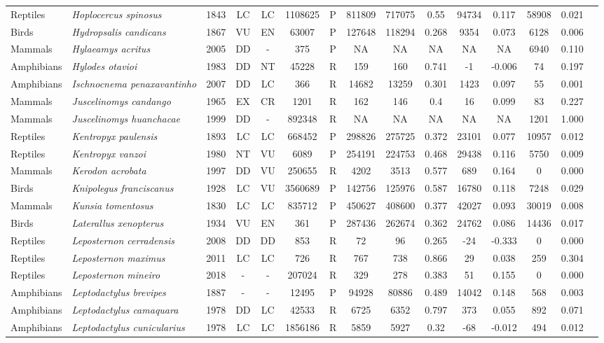 \documentclass[12pt,openright,oneside,a4paper,english]{abntex2}
\begin{document}
\begin{landscape}
\begin{longtable}{llccccccccccccc}
		Reptiles&\textit{Hoplocercus spinosus}&1843&LC&LC&1108625&P&811809&717075&0.55&94734&0.117&58908&0.021\\
		Birds&\textit{Hydropsalis candicans}&1867&VU&EN&63007&P&127648&118294&0.268&9354&0.073&6128&0.006\\
		Mammals&\textit{Hylaeamys acritus}&2005&DD&-&375&P&NA&NA&NA&NA&NA&6940&0.110\\
		Amphibians&\textit{Hylodes otavioi}&1983&DD&NT&45228&R&159&160&0.741&-1&-0.006&74&0.197\\
		Amphibians&\textit{Ischnocnema penaxavantinho}&2007&DD&LC&366&R&14682&13259&0.301&1423&0.097&55&0.001\\
		Mammals&\textit{Juscelinomys candango}&1965&EX&CR&1201&R&162&146&0.4&16&0.099&83&0.227\\
		Mammals&\textit{Juscelinomys huanchacae}&1999&DD&-&892348&R&NA&NA&NA&NA&NA&1201&1.000\\
		Reptiles&\textit{Kentropyx paulensis}&1893&LC&LC&668452&P&298826&275725&0.372&23101&0.077&10957&0.012\\
		Reptiles&\textit{Kentropyx vanzoi}&1980&NT&VU&6089&P&254191&224753&0.468&29438&0.116&5750&0.009\\
		Mammals&\textit{Kerodon acrobata}&1997&DD&VU&250655&R&4202&3513&0.577&689&0.164&0&0.000\\
		Birds&\textit{Knipolegus franciscanus}&1928&LC&VU&3560689&P&142756&125976&0.587&16780&0.118&7248&0.029\\
		Mammals&\textit{Kunsia tomentosus}&1830&LC&LC&835712&P&450627&408600&0.377&42027&0.093&30019&0.008\\
		Birds&\textit{Laterallus xenopterus}&1934&VU&EN&361&P&287436&262674&0.362&24762&0.086&14436&0.017\\
		Reptiles&\textit{Leposternon cerradensis}&2008&DD&DD&853&R&72&96&0.265&-24&-0.333&0&0.000\\
		Reptiles&\textit{Leposternon maximus}&2011&LC&LC&726&R&767&738&0.866&29&0.038&259&0.304\\
		Reptiles&\textit{Leposternon mineiro}&2018&-&-&207024&R&329&278&0.383&51&0.155&0&0.000\\
		Amphibians&\textit{Leptodactylus brevipes}&1887&-&-&12495&P&94928&80886&0.489&14042&0.148&568&0.003\\
		Amphibians&\textit{Leptodactylus camaquara}&1978&DD&LC&42533&R&6725&6352&0.797&373&0.055&892&0.071\\
		Amphibians&\textit{Leptodactylus cunicularius}&1978&LC&LC&1856186&R&5859&5927&0.32&-68&-0.012&494&0.012\\

\end{longtable}
\end{landscape}
\end{document}
